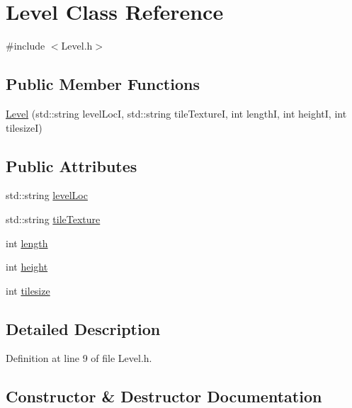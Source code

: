 \hypertarget{class_level}{}\section{Level Class Reference}
\label{class_level}


{\ttfamily \#include $<$Level.\+h$>$}

\subsection*{Public Member Functions}
\begin{DoxyCompactItemize}
\item 
\hyperlink{class_level_ab403c881e1c8911d064b929b18b554c5}{Level} (std\+::string level\+LocI, std\+::string tile\+TextureI, int lengthI, int heightI, int tilesizeI)
\end{DoxyCompactItemize}
\subsection*{Public Attributes}
\begin{DoxyCompactItemize}
\item 
std\+::string \hyperlink{class_level_a141ea386a839536056884a8965a7d0b8}{level\+Loc}
\item 
std\+::string \hyperlink{class_level_a294430cb49d808ff4c63e5f4dbbdcbde}{tile\+Texture}
\item 
int \hyperlink{class_level_a9c1275cd0839ae9af6438b1fbd7780d1}{length}
\item 
int \hyperlink{class_level_a16d1b735f7d513cf18bfff1ad4022f58}{height}
\item 
int \hyperlink{class_level_a8fc823f22882c2201f1488ef7ee3ec20}{tilesize}
\end{DoxyCompactItemize}


\subsection{Detailed Description}


Definition at line 9 of file Level.\+h.



\subsection{Constructor \& Destructor Documentation}
\hypertarget{class_level_ab403c881e1c8911d064b929b18b554c5}{}\label{class_level_ab403c881e1c8911d064b929b18b554c5} 
